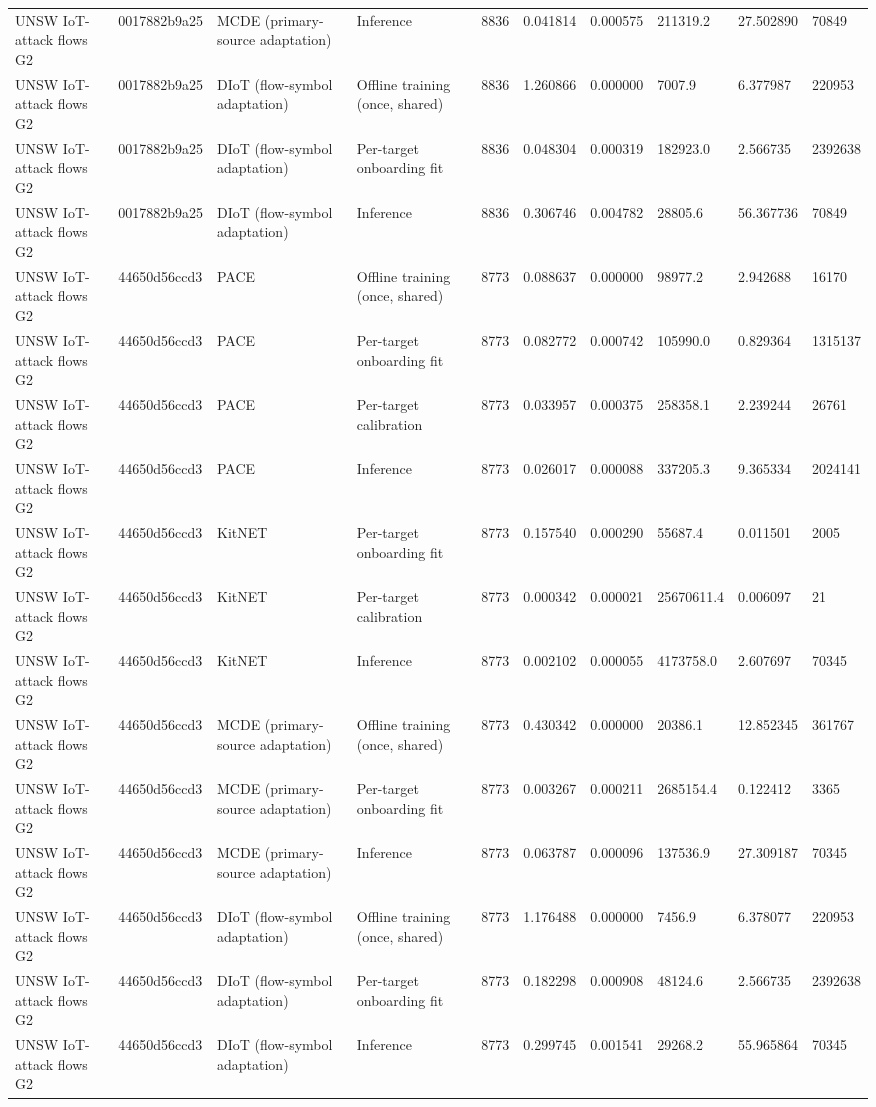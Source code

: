 \begin{tabular}{llllllllll}
UNSW IoT-attack flows G2 & 0017882b9a25 & MCDE (primary-source adaptation) & Inference & 8836 & 0.041814 & 0.000575 & 211319.2 & 27.502890 & 70849 \\
UNSW IoT-attack flows G2 & 0017882b9a25 & DIoT (flow-symbol adaptation) & Offline training (once, shared) & 8836 & 1.260866 & 0.000000 & 7007.9 & 6.377987 & 220953 \\
UNSW IoT-attack flows G2 & 0017882b9a25 & DIoT (flow-symbol adaptation) & Per-target onboarding fit & 8836 & 0.048304 & 0.000319 & 182923.0 & 2.566735 & 2392638 \\
UNSW IoT-attack flows G2 & 0017882b9a25 & DIoT (flow-symbol adaptation) & Inference & 8836 & 0.306746 & 0.004782 & 28805.6 & 56.367736 & 70849 \\
UNSW IoT-attack flows G2 & 44650d56ccd3 & PACE & Offline training (once, shared) & 8773 & 0.088637 & 0.000000 & 98977.2 & 2.942688 & 16170 \\
UNSW IoT-attack flows G2 & 44650d56ccd3 & PACE & Per-target onboarding fit & 8773 & 0.082772 & 0.000742 & 105990.0 & 0.829364 & 1315137 \\
UNSW IoT-attack flows G2 & 44650d56ccd3 & PACE & Per-target calibration & 8773 & 0.033957 & 0.000375 & 258358.1 & 2.239244 & 26761 \\
UNSW IoT-attack flows G2 & 44650d56ccd3 & PACE & Inference & 8773 & 0.026017 & 0.000088 & 337205.3 & 9.365334 & 2024141 \\
UNSW IoT-attack flows G2 & 44650d56ccd3 & KitNET & Per-target onboarding fit & 8773 & 0.157540 & 0.000290 & 55687.4 & 0.011501 & 2005 \\
UNSW IoT-attack flows G2 & 44650d56ccd3 & KitNET & Per-target calibration & 8773 & 0.000342 & 0.000021 & 25670611.4 & 0.006097 & 21 \\
UNSW IoT-attack flows G2 & 44650d56ccd3 & KitNET & Inference & 8773 & 0.002102 & 0.000055 & 4173758.0 & 2.607697 & 70345 \\
UNSW IoT-attack flows G2 & 44650d56ccd3 & MCDE (primary-source adaptation) & Offline training (once, shared) & 8773 & 0.430342 & 0.000000 & 20386.1 & 12.852345 & 361767 \\
UNSW IoT-attack flows G2 & 44650d56ccd3 & MCDE (primary-source adaptation) & Per-target onboarding fit & 8773 & 0.003267 & 0.000211 & 2685154.4 & 0.122412 & 3365 \\
UNSW IoT-attack flows G2 & 44650d56ccd3 & MCDE (primary-source adaptation) & Inference & 8773 & 0.063787 & 0.000096 & 137536.9 & 27.309187 & 70345 \\
UNSW IoT-attack flows G2 & 44650d56ccd3 & DIoT (flow-symbol adaptation) & Offline training (once, shared) & 8773 & 1.176488 & 0.000000 & 7456.9 & 6.378077 & 220953 \\
UNSW IoT-attack flows G2 & 44650d56ccd3 & DIoT (flow-symbol adaptation) & Per-target onboarding fit & 8773 & 0.182298 & 0.000908 & 48124.6 & 2.566735 & 2392638 \\
UNSW IoT-attack flows G2 & 44650d56ccd3 & DIoT (flow-symbol adaptation) & Inference & 8773 & 0.299745 & 0.001541 & 29268.2 & 55.965864 & 70345 \\
\bottomrule
\end{tabular}
